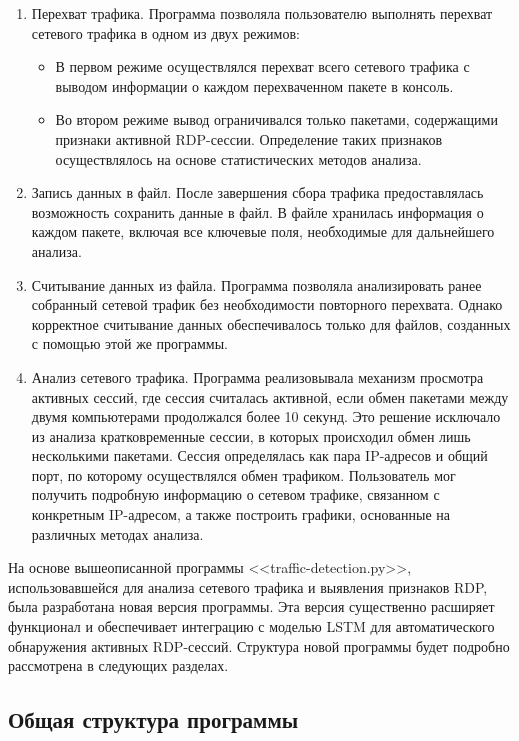 \documentclass[bachelor, och, coursework]{SCWorks}
\begin{document}
\begin{enumerate}
  \item Перехват трафика. Программа позволяла пользователю выполнять перехват сетевого трафика в одном из двух режимов:
    \begin{itemize}
      \item В первом режиме осуществлялся перехват всего сетевого трафика с выводом информации о каждом перехваченном пакете в консоль.
      \item Во втором режиме вывод ограничивался только пакетами, содержащими признаки активной RDP-сессии. Определение таких признаков осуществлялось на 
      основе статистических методов анализа.
    \end{itemize}
  
  \item Запись данных в файл. После завершения сбора трафика предоставлялась возможность сохранить данные в файл. В файле хранилась информация о 
  каждом пакете, включая все ключевые поля, необходимые для дальнейшего анализа.

  \item Считывание данных из файла. Программа позволяла анализировать ранее собранный сетевой трафик без необходимости повторного перехвата. Однако 
  корректное считывание данных обеспечивалось только для файлов, созданных с помощью этой же программы.

  \item Анализ сетевого трафика. Программа реализовывала механизм просмотра активных сессий, где сессия считалась активной, если обмен пакетами между 
  двумя компьютерами продолжался более 10 секунд. Это решение исключало из анализа кратковременные сессии, в которых происходил обмен лишь несколькими пакетами. 
  Сессия определялась как пара IP-адресов и общий порт, по которому осуществлялся обмен трафиком.  
  Пользователь мог получить подробную информацию о сетевом трафике, связанном с конкретным IP-адресом, а также построить графики, основанные на различных 
  методах анализа.
\end{enumerate}

На основе вышеописанной программы <<traffic-detection.py>>, использовавшейся для анализа сетевого трафика и выявления признаков RDP, была разработана новая 
версия программы. Эта версия существенно расширяет функционал и обеспечивает интеграцию с моделью LSTM для автоматического обнаружения активных RDP-сессий. 
Структура новой программы будет подробно рассмотрена в следующих разделах.

\subsection{Общая структура программы}
\end{document}
